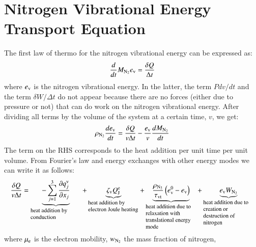 \documentclass{warpdoc}
\newcommand{\ev}{{e_{\rm v}}}
\newcommand{\evzero}{{e_{\rm v}^0}}
\newcommand{\tauvt}{\tau_{\rm vt}}
\begin{document}
\section{Nitrogen Vibrational Energy Transport Equation}

The first law of thermo for the nitrogen vibrational energy can be expressed as:
%
\begin{equation}
   \frac{d }{d t} M_{\rm N_2} \ev = \frac{\delta Q}{\Delta t}
\end{equation}
%
where $\ev$ is the nitrogen vibrational energy.
In the latter, the term $P d v/dt$ and the term $\delta W/\Delta t$ do not appear because there are no forces (either due to pressure or not) that can do work on the nitrogen vibrational energy. After dividing all terms by the volume of the system at a certain time, $v$, we get:
%
\begin{equation}
  \rho_{\rm N_2} \frac{d \ev} {d t}  = \frac{\delta Q}{v \Delta t} - \frac{\ev}{v}  \frac{d M_{\rm N_2} }{d t} 
\end{equation}
%
The term on the RHS corresponds to the heat addition per unit time per unit volume. From Fourier's law and energy exchanges with other energy modes we can write it as follows:
%
\begin{equation}
\frac{\delta Q}{v \Delta t} 
=
\underbrace{
  -\sum_{j=1}^{3}\frac{\partial q_j^{\rm v}}{\partial x_j}
}_{\begin{minipage}{2.5cm}\flushleft \footnotesize heat addition by conduction\end{minipage}}
+
\underbrace{
  \zeta_{\rm v} Q_{\rm J}^{\rm e} 
}_{\begin{minipage}{2.5cm}\flushleft \footnotesize heat addition by electron Joule heating\end{minipage}}
+ 
\underbrace{
  {\frac{\rho_{\rm N_2}}{\tauvt}}\left( \evzero-\ev \right) 
}_{\begin{minipage}{2.5cm}\flushleft \footnotesize heat addition due to relaxation with translational energy mode\end{minipage}}
+
\underbrace{
  e_{\rm v} W_{\rm N_2}
}_{\begin{minipage}{2.5cm}\flushleft \footnotesize heat addition due to creation or destruction of nitrogen\end{minipage}}
\end{equation}
%
where $\mu_{\rm e}$ is the electron mobility, $w_{\rm N_2}$ the mass fraction of nitrogen,
\end{document}

